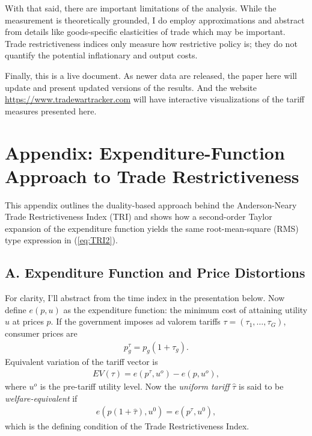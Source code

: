 \documentclass[12pt,pdftex]{article}
\begin{document}
\begin{onehalfspacing}
With that said, there are important limitations of the analysis. While the measurement is theoretically grounded, I do employ approximations and abstract from details like goods-specific elasticities of trade which may be important. Trade restrictiveness indices only measure how restrictive policy is; they do not quantify the potential inflationary and output costs.

Finally, this is a live document. As newer data are released, the paper here will update and present updated versions of the results.  And the website \url{https://www.tradewartracker.com} will have interactive visualizations of the tariff measures presented here.

\afterpage{%
\clearpage



}

\afterpage{%
\clearpage
\begin{landscape}

\end{landscape}
}

\newpage




\newpage

\section*{Appendix: Expenditure-Function Approach to Trade Restrictiveness}

This appendix outlines the duality-based approach behind the Anderson-Neary Trade Restrictiveness Index (TRI) and shows how a second-order Taylor expansion of the expenditure function yields the same root-mean-square (RMS) type expression in (\ref{eq:TRI2}).

\subsection*{A. Expenditure Function and Price Distortions}

For clarity, I'll abstract from the time index in the presentation below. Now define $e(p,u)$ as the expenditure function: the minimum cost of attaining utility $u$ at prices $p$. If the government imposes ad valorem tariffs $\tau = (\tau_1,\ldots,\tau_G)$, consumer prices are
\begin{align}
p^\tau_g = p_g(1+\tau_g).
\end{align}
Equivalent variation of the tariff vector is
\begin{align}
EV(\tau) = e(p^\tau, u^o) - e(p, u^o),
\end{align}
where $u^o$ is the pre-tariff utility level. Now the \emph{uniform tariff} $\hat{\tau}$ is said to be \emph{welfare-equivalent} if
\begin{align}
e(p(1+\hat{\tau}),u^0) = e(p^\tau,u^0),
\end{align}
which is the defining condition of the Trade Restrictiveness Index.


\end{onehalfspacing}
\end{document}
